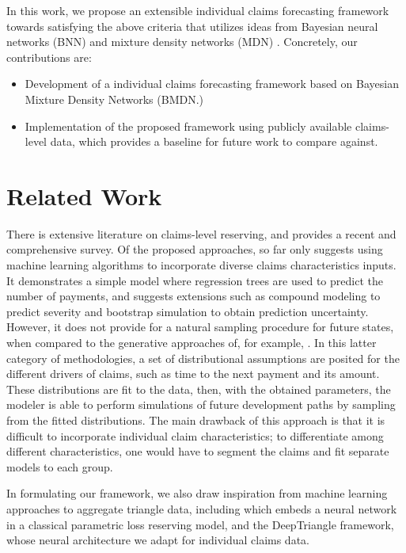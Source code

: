 \documentclass{article}
\begin{document}
In this work, we propose an extensible individual claims forecasting framework towards satisfying the above criteria that utilizes ideas from Bayesian neural networks (BNN) \cite{Neal:1996:BLN:525544} and mixture density networks (MDN) \cite{bishop1994mixture}. Concretely, our contributions are:

\begin{itemize}
	\item Development of a individual claims forecasting framework based on Bayesian Mixture Density Networks (BMDN.)
	\item Implementation of the proposed framework using publicly available claims-level data, which provides a baseline for future work to compare against.
\end{itemize}

\section{Related Work}

There is extensive literature on claims-level reserving, and \cite{boumezoued2017individual} provides a recent and comprehensive survey. Of the proposed approaches, so far only \cite{wuthrich2018machine} suggests using machine learning algorithms to incorporate diverse claims characteristics inputs. It demonstrates a simple model where regression trees are used to predict the number of payments, and suggests extensions such as compound modeling to predict severity and bootstrap simulation to obtain prediction uncertainty. However, it does not provide for a natural sampling procedure for future states, when compared to the generative approaches of, for example, \cite{antonio2014micro, pigeon2013individual, pigeon2014individual}. In this latter category of methodologies, a set of distributional assumptions are posited for the different drivers of claims, such as time to the next payment and its amount. These distributions are fit to the data, then, with the obtained parameters, the modeler is able to perform simulations of future development paths by sampling from the fitted distributions. The main drawback of this approach is that it is difficult to incorporate individual claim characteristics; to differentiate among different characteristics, one would have to segment the claims and fit separate models to each group.

In formulating our framework, we also draw inspiration from machine learning approaches to aggregate triangle data, including \cite{gabrielli2018neural} which embeds a neural network in a classical parametric loss reserving model, and the DeepTriangle \cite{kuo2018deeptriangle} framework, whose neural architecture we adapt for individual claims data.
\end{document}
